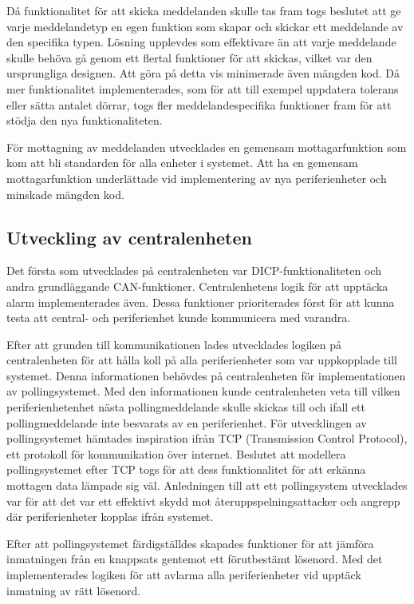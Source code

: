 \documentclass[a4paper]{article}
\begin{document}
Då funktionalitet för att skicka meddelanden skulle tas fram togs beslutet att ge varje meddelandetyp en egen funktion som skapar och skickar ett meddelande av den specifika typen.
Lösning upplevdes som effektivare än att varje meddelande skulle behöva gå genom ett flertal funktioner för att skickas, vilket var den ursprungliga designen.
Att göra på detta vis minimerade även mängden kod.
Då mer funktionalitet implementerades, som för att till exempel uppdatera tolerans eller sätta antalet dörrar, togs fler meddelandespecifika funktioner fram för att stödja den nya funktionaliteten.

För mottagning av meddelanden utvecklades  en gemensam mottagarfunktion som kom att bli standarden för alla enheter i systemet.
Att ha en gemensam mottagarfunktion underlättade vid implementering av nya periferienheter och minskade mängden kod.


\subsection{Utveckling av centralenheten}
Det första som utvecklades på centralenheten var DICP-funktionaliteten och andra grundläggande CAN-funktioner.
Centralenhetens logik för att upptäcka alarm implementerades även.
Dessa funktioner prioriterades först för att kunna testa att central- och periferienhet kunde kommunicera med varandra.

Efter att grunden till kommunikationen lades utvecklades logiken på centralenheten för att hålla koll på alla periferienheter som var uppkopplade till systemet.
Denna informationen behövdes på centralenheten för implementationen av pollingsystemet.
Med den informationen kunde centralenheten veta till vilken periferienhetenhet nästa pollingmeddelande skulle skickas till och ifall ett pollingmeddelande inte besvarats av en periferienhet.
För utvecklingen av pollingsystemet hämtades inspiration ifrån TCP (Transmission Control Protocol), ett protokoll för kommunikation över internet.
Beslutet att modellera pollingsystemet efter TCP togs för att dess funktionalitet för att erkänna mottagen data lämpade sig väl.
Anledningen till att ett pollingsystem utvecklades var för att det var ett effektivt skydd mot återuppspelningsattacker och angrepp där periferienheter kopplas ifrån systemet.

Efter att pollingsystemet färdigställdes skapades funktioner för att jämföra inmatningen från en knappsats gentemot ett förutbestämt lösenord.
Med det implementerades logiken för att avlarma alla periferienheter vid upptäck inmatning av rätt lösenord.
\end{document}
